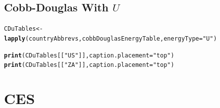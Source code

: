\documentclass[preprint,authoryear,12pt]{elsarticle}\usepackage{graphicx, color}
\makeatletter
\newcommand{\hlfunctioncall}[1]{\textcolor[rgb]{0.501960784313725,0,0.329411764705882}{\textbf{#1}}}%
\newcommand{\hlstring}[1]{\textcolor[rgb]{0.6,0.6,1}{#1}}%
\newenvironment{kframe}{%
 \def\at@end@of@kframe{}%
 \ifinner\ifhmode%
  \def\at@end@of@kframe{\end{minipage}}%
  \begin{minipage}{\columnwidth}%
 \fi\fi%
 \def\FrameCommand##1{\hskip\@totalleftmargin \hskip-\fboxsep
 \colorbox{shadecolor}{##1}\hskip-\fboxsep
     \hskip-\linewidth \hskip-\@totalleftmargin \hskip\columnwidth}%
 \MakeFramed {\advance\hsize-\width
   \@totalleftmargin\z@ \linewidth\hsize
   \@setminipage}}%
 {\par\unskip\endMakeFramed%
 \at@end@of@kframe}
\newenvironment{knitrout}{}{} %
\makeatother
\begin{document}
\subsection{Cobb-Douglas With $U$}

\begin{knitrout}
\color{fgcolor}\begin{kframe}
\begin{alltt}
CDuTables <- \hlfunctioncall{lapply}(countryAbbrevs, cobbDouglasEnergyTable, energyType=\hlstring{"U"})
\end{alltt}
\end{kframe}
\end{knitrout}


\begin{kframe}
\begin{alltt}
\hlfunctioncall{print}(CDuTables[[\hlstring{"US"}]], caption.placement=\hlstring{"top"})
\hlfunctioncall{print}(CDuTables[[\hlstring{"ZA"}]], caption.placement=\hlstring{"top"})
\end{alltt}
\end{kframe}


\section{CES}
\end{document}

